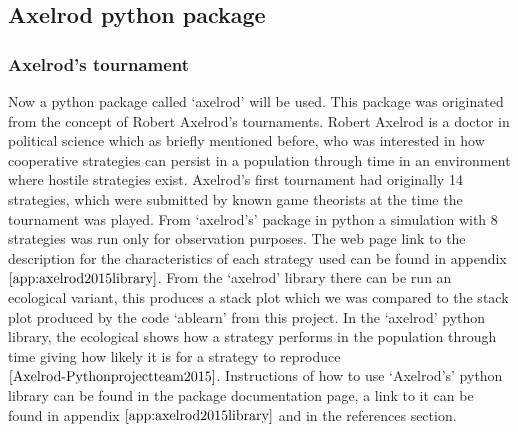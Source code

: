 \subsection{Axelrod python package}
\subsubsection{Axelrod's tournament}
Now a python package called `axelrod' will be used. This package was originated from the concept of Robert Axelrod's tournaments. Robert Axelrod is a doctor in political science which as briefly mentioned before, who was interested in how cooperative strategies can persist in a population through time in an environment where hostile strategies exist.
Axelrod’s first tournament had originally 14 strategies, which were submitted by known game theorists at the time the tournament was played. From `axelrod's' package in python a simulation with 8 strategies was run only for observation purposes. The web page link to the description for the characteristics of each strategy used can be found in appendix $\ref{app:axelrod2015library}$.
From the `axelrod' library there can be run an ecological variant, this produces a stack plot which we was compared to the stack plot produced by the code `ablearn' from this project. In the `axelrod' python library, the ecological shows how a strategy performs in the population through time giving how likely it is for a strategy to reproduce $\cite{Axelrod-Pythonprojectteam2015}$. Instructions of how to use `Axelrod's' python library can be found in the package documentation page, a link to it can be found in appendix $\ref{app:axelrod2015library}$ and in the references section.

